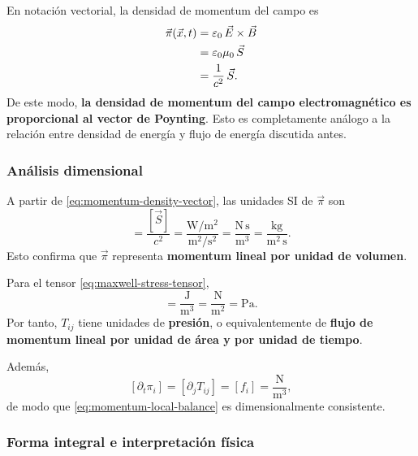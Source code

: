 \documentclass[12pt,a4paper]{article}
\theoremstyle{definition}
\theoremstyle{plain}
\numberwithin{equation}{section}
\theoremstyle{remark}
\newcommand{\E}{\vec{E}}
\newcommand{\B}{\vec{B}}
\begin{document}
En notación vectorial, la densidad de momentum del campo es
\begin{align}
    \vec\pi(\vec x,t)
    &=\varepsilon_0\,\E\times\B \notag\\
    &=\varepsilon_0\mu_0\,\vec S \notag\\
    &=\frac{1}{c^2}\,\vec S.
    \label{eq:momentum-density-vector}
\end{align}
De este modo, \textbf{la densidad de momentum del campo electromagnético es proporcional al vector de Poynting}. Esto es completamente análogo a la relación entre densidad de energía y flujo de energía discutida antes.

\subsubsection*{Análisis dimensional}

A partir de \eqref{eq:momentum-density-vector}, las unidades SI de $\vec\pi$ son
\begin{equation}
    [\vec\pi]
    =
    \frac{[\vec S]}{c^2}
    =
    \frac{\mathrm{W}/\mathrm{m}^2}{\mathrm{m}^2/\mathrm{s}^2}
    =
    \frac{\mathrm{N\,s}}{\mathrm{m}^3}
    =
    \frac{\mathrm{kg}}{\mathrm{m}^2\,\mathrm{s}}.
    \label{eq:units-pi}
\end{equation}
Esto confirma que $\vec\pi$ representa \textbf{momentum lineal por unidad de volumen}.

Para el tensor \eqref{eq:maxwell-stress-tensor},
\begin{equation}
    [T_{ij}]
    =
    \frac{\mathrm{J}}{\mathrm{m}^3}
    =
    \frac{\mathrm{N}}{\mathrm{m}^2}
    =
    \mathrm{Pa}.
    \label{eq:units-T}
\end{equation}
Por tanto, $T_{ij}$ tiene unidades de \textbf{presión}, o equivalentemente de \textbf{flujo de momentum lineal por unidad de área y por unidad de tiempo}.

Además,
\begin{equation}
    \left[\partial_t\pi_i\right]
    =
    \left[\partial_jT_{ij}\right]
    =
    [f_i]
    =
    \frac{\mathrm{N}}{\mathrm{m}^3},
    \label{eq:units-local-momentum-balance}
\end{equation}
de modo que \eqref{eq:momentum-local-balance} es dimensionalmente consistente.

\subsubsection*{Forma integral e interpretación física}
\end{document}
